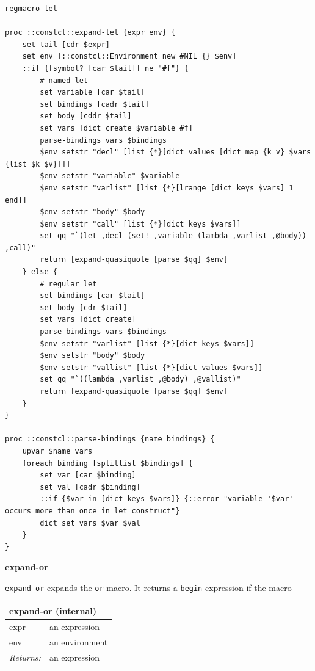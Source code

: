 \documentclass[twoside,9pt]{report}
\begin{document}
\noindent\makebox[\linewidth]{\rule{\linewidth}{0.4pt}}
\begin{lstlisting}
regmacro let
 
proc ::constcl::expand-let {expr env} {
    set tail [cdr $expr]
    set env [::constcl::Environment new #NIL {} $env]
    ::if {[symbol? [car $tail]] ne "#f"} {
        # named let
        set variable [car $tail]
        set bindings [cadr $tail]
        set body [cddr $tail]
        set vars [dict create $variable #f]
        parse-bindings vars $bindings
        $env setstr "decl" [list {*}[dict values [dict map {k v} $vars {list $k $v}]]]
        $env setstr "variable" $variable
        $env setstr "varlist" [list {*}[lrange [dict keys $vars] 1 end]]
        $env setstr "body" $body
        $env setstr "call" [list {*}[dict keys $vars]]
        set qq "`(let ,decl (set! ,variable (lambda ,varlist ,@body)) ,call)"
        return [expand-quasiquote [parse $qq] $env]
    } else {
        # regular let
        set bindings [car $tail]
        set body [cdr $tail]
        set vars [dict create]
        parse-bindings vars $bindings
        $env setstr "varlist" [list {*}[dict keys $vars]]
        $env setstr "body" $body
        $env setstr "vallist" [list {*}[dict values $vars]]
        set qq "`((lambda ,varlist ,@body) ,@vallist)"
        return [expand-quasiquote [parse $qq] $env]
    }
}
 
proc ::constcl::parse-bindings {name bindings} {
    upvar $name vars
    foreach binding [splitlist $bindings] {
        set var [car $binding]
        set val [cadr $binding]
        ::if {$var in [dict keys $vars]} {::error "variable '$var' occurs more than once in let construct"}
        dict set vars $var $val
    }
}
\end{lstlisting}
\noindent\makebox[\linewidth]{\rule{\linewidth}{0.4pt}}

\textbf{expand-or}


\texttt{expand-or} expands the \texttt{or} macro. It returns a \texttt{begin}-expression if the macro

\begin{tabular}{ |l l| }
\hline
\multicolumn{2}{|l|}{expand-or (internal)} \\
\hline
expr & an expression \\
env & an environment \\
\textit{Returns:} & an expression \\
\hline
\end{tabular}
\end{document}
